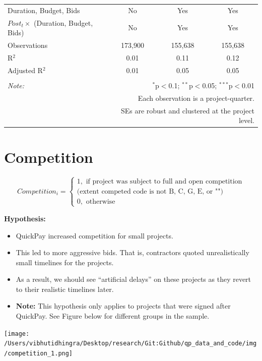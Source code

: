 \documentclass[
]{article}
\providecommand{\tightlist}{%
  \setlength{\itemsep}{0pt}\setlength{\parskip}{0pt}}
\begin{document}
\begin{table}[H]
\begin{tabular}{@{\extracolsep{-2pt}}lccc}
Duration, Budget, Bids & No & Yes & Yes \\ 
$Post_t \times$  (Duration, Budget, Bids) & No & Yes & Yes \\ 
Observations & 173,900 & 155,638 & 155,638 \\ 
R$^{2}$ & 0.01 & 0.11 & 0.12 \\ 
Adjusted R$^{2}$ & 0.01 & 0.05 & 0.05 \\ 
\hline 
\hline \\[-1.8ex] 
\textit{Note:}  & \multicolumn{3}{r}{$^{*}$p$<$0.1; $^{**}$p$<$0.05; $^{***}$p$<$0.01} \\ 
 & \multicolumn{3}{r}{Each observation is a project-quarter.} \\ 
 & \multicolumn{3}{r}{SEs are robust and clustered at the project level.} \\ 
\end{tabular} 
\end{table}

\hypertarget{competition}{%
\section{Competition}\label{competition}}

\[ Competition_i = \begin{cases} 1, \text{ if project was subject to full and open competition}\\ 
                       \text{(extent competed code is not B, C, G, E, or "")}\\
0, \text{ otherwise} \end{cases}\]

\textbf{Hypothesis:}

\begin{itemize}
\tightlist
\item
  QuickPay increased competition for small projects.
\item
  This led to more aggressive bids. That is, contractors quoted
  unrealistically small timelines for the projects.
\item
  As a result, we should see ``artificial delays'' on these projects as
  they revert to their realistic timelines later.
\item
  \textbf{Note:} This hypothesis only applies to projects that were
  signed after QuickPay. See Figure below for different groups in the
  sample.
\end{itemize}

\texttt{[image: /Users/vibhutidhingra/Desktop/research/Git:Github/qp\_data\_and\_code/img/competition\_1.png]}
\end{document}
